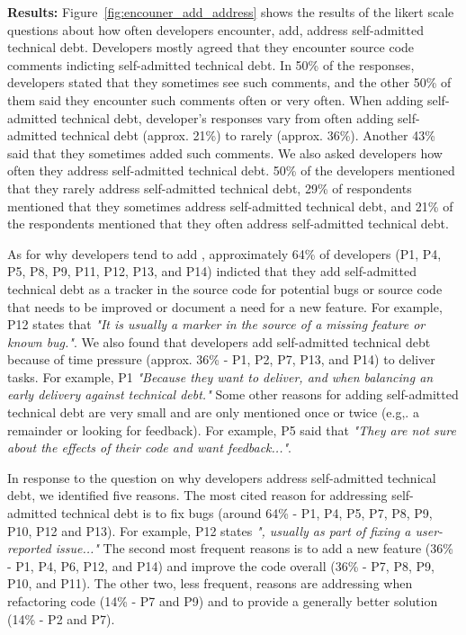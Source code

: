 \noindent \textbf{Results:} 
Figure~\ref{fig:encouner_add_address} shows the results of the likert scale questions about how often developers encounter, add, address self-admitted technical debt. Developers mostly agreed that they encounter source code comments indicting self-admitted technical debt. In 50\% of the responses, developers stated that they sometimes see such comments, and the other 50\% of them said they encounter such comments often or very often. When adding self-admitted technical debt, developer's responses vary from often adding self-admitted technical debt (approx. 21\%) to rarely (approx. 36\%). Another 43\% said that they sometimes added such comments. We also asked developers how often they address self-admitted technical debt. 50\% of the developers mentioned that they rarely address self-admitted technical debt, 29\% of respondents mentioned that they sometimes address self-admitted technical debt, and 21\% of the respondents mentioned that they often address self-admitted technical debt.

As for why developers tend to add \SATD, approximately 64\% of developers (P1, P4, P5, P8, P9, P11, P12, P13, and P14) indicted that they add self-admitted technical debt as a tracker in the source code for potential bugs or source code that needs to be improved or document a need for a new feature. For example, P12 states that \textit{"It is usually a marker in the source of a missing feature or known bug."}. We also found that developers add self-admitted technical debt because of time pressure (approx. 36\% - P1, P2, P7, P13, and P14) to deliver tasks. For example, P1 \textit{"Because they want to deliver, and when balancing an early delivery against technical debt."} Some other reasons for adding self-admitted technical debt are very small and are only mentioned once or twice (e.g,. a remainder or looking for feedback). For example, P5 said that \textit{"They are not sure about the effects of their code and want feedback..."}.

In response to the question on why developers address self-admitted technical debt, we identified five reasons. The most cited reason for addressing self-admitted technical debt is to fix bugs (around 64\% - P1, P4, P5, P7, P8, P9, P10, P12 and P13). For example, P12 states \textit{", usually as part of fixing a user-reported issue..."} The second most frequent reasons is to add a new feature (36\% - P1, P4, P6, P12, and P14) and improve the code overall (36\% - P7, P8, P9, P10, and P11). The other two, less frequent, reasons are addressing \SATD when refactoring code (14\% - P7 and P9) and to provide a generally better solution (14\% - P2 and P7). 



